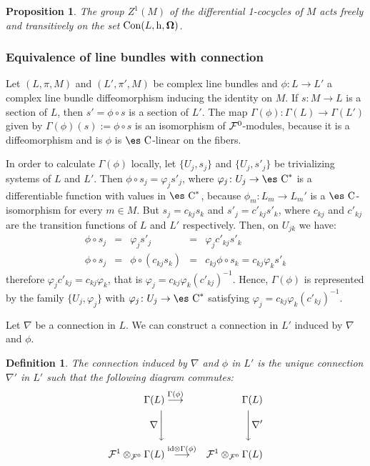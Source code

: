 \documentclass[12pt]{article}
\newtheorem{prop}{Proposition}
\newtheorem{definition}{Definition}
\def\beann{\begin{eqnarray*}}
\def\eeann{\end{eqnarray*}}
\def\mapping#1{\mathrel{\mathop{\longrightarrow}\limits^{#1}}}
\def\h{{\rm h}}
\def\curv{{\bf \Omega}}
\def\Complex{\mbox{\es C}}
\begin{document}
\begin{prop}
The group $Z^1(M)$ of the differential 1-cocycles of $M$
acts freely and transitively on the set
${\rm Con}(L,\h ,\curv )$.
\end{prop}


\subsubsection{Equivalence of line bundles with connection}


Let $(L,\pi ,M)$ and $(L',\pi',M)$ be complex line bundles and
$\phi \colon L \to L'$ a complex line bundle diffeomorphism
inducing the identity on $M$.
If $s \colon M \to L$ is a section of $L$,
then $s' = \phi \circ s$ is a section of $L'$.
The map $\Gamma (\phi) \colon \Gamma (L) \to \Gamma (L')$
given by $\Gamma (\phi)(s) := \phi \circ s$
is an isomorphism of ${\cal F}^0$-modules,
because it is a diffeomorphism and is
$\phi$ is $\Complex$-linear on the fibers.

In order to calculate $\Gamma (\phi)$ locally,
let $\{ U_j,s_j \}$ and $\{ U_j,s'_j \}$ be
trivializing systems of $L$ and $L'$.
Then $\phi \circ s_j = \varphi_j s'_j$,
where $\varphi_j \colon U_j \to \Complex^*$
is a differentiable function with values in
$\Complex^*$, because
$\phi_m \colon L_m \to L_m'$
is a $\Complex$-isomorphism for every $m \in M$.
But $s_j = c_{kj}s_k$
and $s'_j = c'_{kj}s'_k$,
where $c_{kj}$ and $c'_{kj}$
are the transition functions of $L$ and $L'$ respectively.
Then, on $U_{jk}$ we have:
$$
\begin{array}{ccccc}
\phi \circ s_j &=& \varphi_j s'_j &=&
\varphi_j c'_{kj}s'_k
\\
\phi \circ s_j &=& \phi \circ (c_{kj}s_k) &=&
c_{kj}\phi \circ s_k = c_{kj}\varphi_k s'_k
\end{array}
$$
therefore $\varphi_j c'_{kj} = c_{kj} \varphi_k$,
that is $\varphi_j = c_{kj} \varphi_k (c'_{kj})^{-1}$.
Hence, $\Gamma (\phi)$ is represented by the family
$\{ U_j,\varphi_j \}$
with $\varphi_j \colon U_j \to \Complex^*$
satisfying
$\varphi_j = c_{kj} \varphi_k (c'_{kj})^{-1}$.

Let $\nabla$ be a connection in $L$.
We can construct a connection in $L'$ induced by $\nabla$ and $\phi$.

\begin{definition}
The {\rm connection induced} by $\nabla$ and $\phi$ in $L'$ is the
unique connection $\nabla '$ in $L'$
such that the following diagram commutes:
\beann
\Gamma (L) &\mapping{\Gamma (\phi)} & \Gamma (L)
\\
\nabla \Bigg\downarrow & & \Bigg\downarrow \nabla '
\\
{\cal F}^1 \otimes_{{\cal F}^0} \Gamma (L)
&\mapping{{\rm id} \otimes \Gamma (\phi)} &
{\cal F}^1 \otimes_{{\cal F}^0} \Gamma (L)
\eeann
\end{definition}
\end{document}

